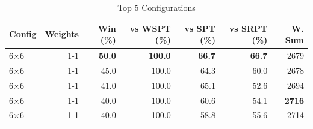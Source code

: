 \begin{table}[htbp]%
\centering%
\begin{tabular}{lrrrrrr}%
\toprule%
\textbf{Config}&\textbf{Weights}&\textbf{Win (\%)}&\textbf{vs WSPT (\%)}&\textbf{vs SPT (\%)}&\textbf{vs SRPT (\%)}&\textbf{W. Sum}\\%
\midrule%
6×6&1-1&\textbf{50.0}&\textbf{100.0}&\textbf{66.7}&\textbf{66.7}&2679\\%
6×6&1-1&45.0&100.0&64.3&60.0&2678\\%
6×6&1-1&41.0&100.0&65.1&52.6&2694\\%
6×6&1-1&40.0&100.0&60.6&54.1&\textbf{2716}\\%
6×6&1-1&40.0&100.0&58.8&55.6&2714\\%
\bottomrule%
\end{tabular}%
\caption{Top 5 Configurations}%
\label{tab:summary}%
\end{table}